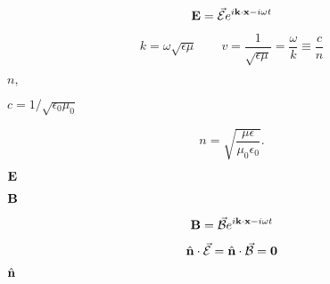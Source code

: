 \documentclass[10pt]{book}
\begin{document}
\begin{mdSnippets}
\newcommand{\vBB}{\vec{\mathcal{B}}}
\newcommand{\vEE}{\vec{\mathcal{E}}}
\newco

\begin{mdDisplaySnippet}[897069586463aa5d62c798d577b25811]%
\[%
\vb{E} = \va{\mathcal{E}} e^{i\vb{k} \cdot \vb{x} - i\omega t}
\]%
\end{mdDisplaySnippet}%
\begin{mdDisplaySnippet}[e5698db7073d212b4001a77dd8ad0bd4]%
\[%
k = \omega \sqrt{\epsilon \mu}
\qquad
v = \frac{1}{\sqrt{\epsilon \mu}} = \frac{\omega}{k} \equiv \frac{c}{n}
\]%
\end{mdDisplaySnippet}%
\begin{mdInlineSnippet}[1a58f249932a2915e61842f01ae0feca]%
$n,$\end{mdInlineSnippet}%
\begin{mdInlineSnippet}%
$c = 1/\sqrt{\epsilon_0\mu_0}$\end{mdInlineSnippet}%
\begin{mdDisplaySnippet}[45c61f2c5d8072b124319e48aa14d2f1]%
\[%
n = \sqrt{\frac{\mu\epsilon}{\mu_0\epsilon_0}}.
\]%
\end{mdDisplaySnippet}%
\begin{mdInlineSnippet}[3177c3b789270ed3013a4e6066f64dd6]%
$\vb{E}$\end{mdInlineSnippet}%
\begin{mdInlineSnippet}%
$\vb{B}$\end{mdInlineSnippet}%
\begin{mdDisplaySnippet}[71db51a338fa7bcd009dc0f2d9615195]%
\[%
\vb{B} = \va{\mathcal{B}} e^{i\vb{k} \cdot \vb{x} - i\omega t}
\]%
\end{mdDisplaySnippet}%
\begin{mdDisplaySnippet}[1aa9819f174eb98ac1efd83f003c3896]%
\[%
\hat{\vb{n}} \cdot \va{\mathcal{E}} = \hat{\vb{n}} \cdot \va{\mathcal{B}} = \vb{0}
\]%
\end{mdDisplaySnippet}%
\begin{mdInlineSnippet}%
$\hat{\vb{n}}$\end{mdInlineSnippet}%

\end{mdSnippets}
\end{document}
